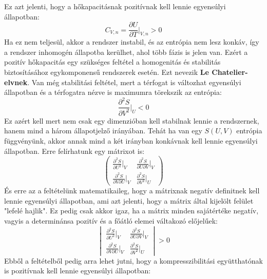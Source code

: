 \documentclass[../main.tex]{subfiles}
\begin{document}
Ez azt jelenti, hogy a hőkapacitásnak pozitívnak kell lennie egyensúlyi állapotban:
\begin{equation}
    C_{V,n} = \frac{\partial U}{\partial T}\bigg|_{V,n} > 0
\end{equation}
Ha ez nem teljesül, akkor a rendszer instabil, és az entrópia nem lesz konkáv, így a rendszer inhomogén állapotba kerülhet, ahol több fázis is jelen van.
Ezért a pozitív hőkapacitás egy szükséges feltétel a homogenitás és stabilitás biztosításához egykomponensű rendszerek esetén. Ezt nevezik \textbf{Le Chatelier-elvnek}.
\newline
\newline
Van még stabilitási feltétel, mert a térfogat is változhat egyensúlyi állapotban és a térfogatra nézve is maximumra törekszik az entrópia:
\begin{equation}
    \frac{\partial^2 S}{\partial V^2}\bigg|_{U} < 0
\end{equation}
Ez azért kell mert nem csak egy dimenzióban kell stabilnak lennie a rendszernek, hanem mind a három állapotjelző irányában.
Tehát ha van egy $S(U, V)$ entrópia függvényünk, akkor annak mind a két irányban konkávnak kell lennie egyensúlyi állapotban. Erre felírhatunk egy mátrixot is:
\begin{equation}
    \begin{pmatrix}
    \frac{\partial^2 S}{\partial U^2}\big|_{V} & \frac{\partial^2 S}{\partial U \partial V}\big|_{V} \\
    \frac{\partial^2 S}{\partial V \partial U}\big|_{V} & \frac{\partial^2 S}{\partial V^2}\big|_{U}
    \end{pmatrix}
\end{equation}
És erre az a feltételünk matematikaileg, hogy a mátrixnak negatív definitnek kell lennie egyensúlyi állapotban, ami azt jelenti, hogy a mátrix által kijelölt
felület "lefelé hajlik". Ez pedig csak akkor igaz, ha a mátrix minden sajátértéke negatív, vagyis a determinánsa pozitív és a főátló elemei váltakozó előjelűek:
\begin{equation}
    \begin{vmatrix}
    \frac{\partial^2 S}{\partial U^2}\big|_{V} & \frac{\partial^2 S}{\partial U \partial V}\big|_{V} \\
    \frac{\partial^2 S}{\partial V \partial U}\big|_{V} & \frac{\partial^2 S}{\partial V^2}\big|_{U}
    \end{vmatrix} > 0
\end{equation}
Ebből a feltételből pedig arra lehet jutni, hogy a kompresszibilitási együtthatónak is pozitívnak kell lennie egyensúlyi állapotban:
\end{document}
